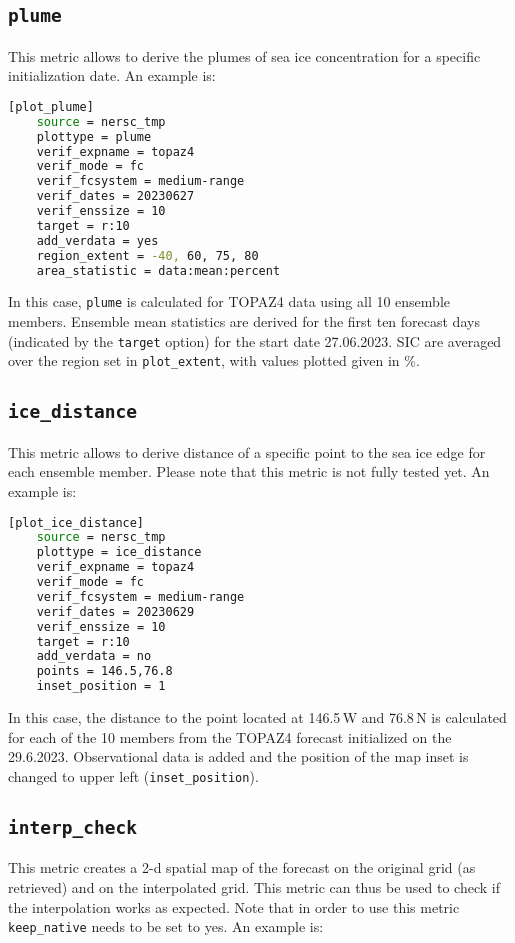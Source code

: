 \documentclass[DIV=10, parskip=full]{scrreprt}
\newcommand{\notimplement}[1]{#1}
\begin{document}
\subsection{\texttt{plume}}
This metric allows to derive the plumes of  sea ice concentration for a specific initialization date. An example is:

\begin{lstlisting}[language=bash]
	[plot_plume]
	source = nersc_tmp   
	plottype = plume 
	verif_expname = topaz4 
	verif_mode = fc
	verif_fcsystem = medium-range
	verif_dates = 20230627
	verif_enssize = 10
	target = r:10
	add_verdata = yes
	region_extent = -40, 60, 75, 80
	area_statistic = data:mean:percent
\end{lstlisting}

In this case, \texttt{plume} is calculated for TOPAZ4 data using all 10 ensemble members. Ensemble mean statistics are derived for the first ten forecast days (indicated by the \texttt{target} option) for the start date 27.06.2023. SIC are averaged over the region set in \texttt{plot\_extent}, with values plotted given in \%.

\subsection{\texttt{ice\_distance}}
This metric allows to derive distance of a specific point to the sea ice edge for each ensemble member. \notimplement{Please note that this metric is not fully tested yet. An example is}:

\begin{lstlisting}[language=bash]
	[plot_ice_distance]
	source = nersc_tmp
	plottype = ice_distance
	verif_expname = topaz4
	verif_mode = fc
	verif_fcsystem = medium-range
	verif_dates = 20230629
	verif_enssize = 10
	target = r:10
	add_verdata = no
	points = 146.5,76.8
	inset_position = 1
\end{lstlisting}

In this case, the distance to the point located at 146.5\,W and 76.8\,N is calculated for each of the 10 members from the TOPAZ4 forecast initialized on the 29.6.2023. Observational data is added and the position of the map inset is changed to upper left (\texttt{inset\_position}).


\subsection{\texttt{interp\_check}}
This metric creates a 2-d spatial map of the forecast on the original grid (as retrieved) and on the interpolated grid. This metric can thus be used to check if the interpolation works as expected. Note that in order to use this metric \texttt{keep\_native} needs to be set to yes. An example is:
\end{document}
